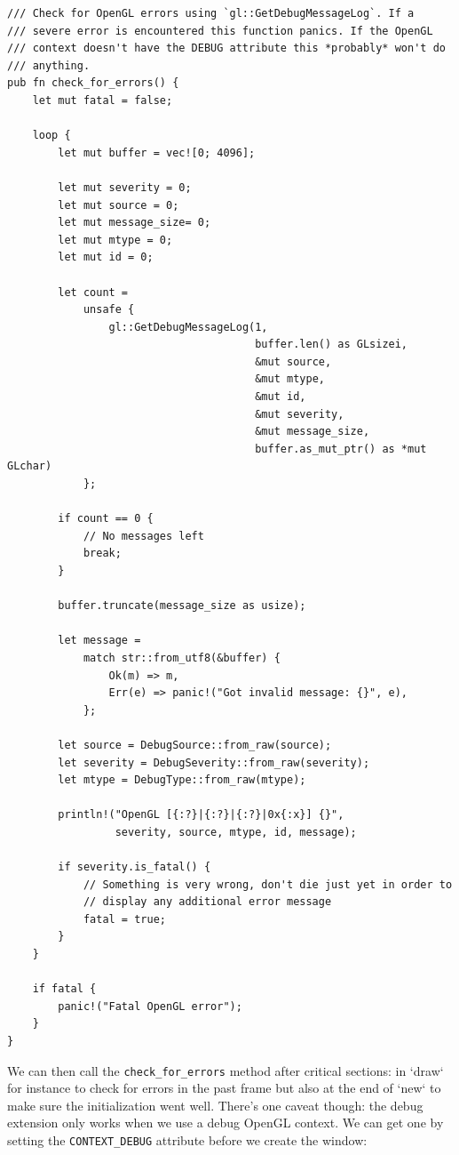 \documentclass[a4paper]{article}
\newcommand{\code}[1] {\texttt{#1}}
\begin{document}
\begin{lstlisting}
/// Check for OpenGL errors using `gl::GetDebugMessageLog`. If a
/// severe error is encountered this function panics. If the OpenGL
/// context doesn't have the DEBUG attribute this *probably* won't do
/// anything.
pub fn check_for_errors() {
    let mut fatal = false;

    loop {
        let mut buffer = vec![0; 4096];

        let mut severity = 0;
        let mut source = 0;
        let mut message_size= 0;
        let mut mtype = 0;
        let mut id = 0;

        let count =
            unsafe {
                gl::GetDebugMessageLog(1,
                                       buffer.len() as GLsizei,
                                       &mut source,
                                       &mut mtype,
                                       &mut id,
                                       &mut severity,
                                       &mut message_size,
                                       buffer.as_mut_ptr() as *mut GLchar)
            };

        if count == 0 {
            // No messages left
            break;
        }

        buffer.truncate(message_size as usize);

        let message =
            match str::from_utf8(&buffer) {
                Ok(m) => m,
                Err(e) => panic!("Got invalid message: {}", e),
            };

        let source = DebugSource::from_raw(source);
        let severity = DebugSeverity::from_raw(severity);
        let mtype = DebugType::from_raw(mtype);

        println!("OpenGL [{:?}|{:?}|{:?}|0x{:x}] {}",
                 severity, source, mtype, id, message);

        if severity.is_fatal() {
            // Something is very wrong, don't die just yet in order to
            // display any additional error message
            fatal = true;
        }
    }

    if fatal {
        panic!("Fatal OpenGL error");
    }
}
\end{lstlisting}

We can then call the \code{check\_for\_errors} method after critical
sections: in `draw` for instance to check for errors in the past frame
but also at the end of `new` to make sure the initialization went
well. There's one caveat though: the debug extension only works when
we use a debug OpenGL context. We can get one by setting the
\code{CONTEXT\_DEBUG} attribute before we create the window:
\end{document}
